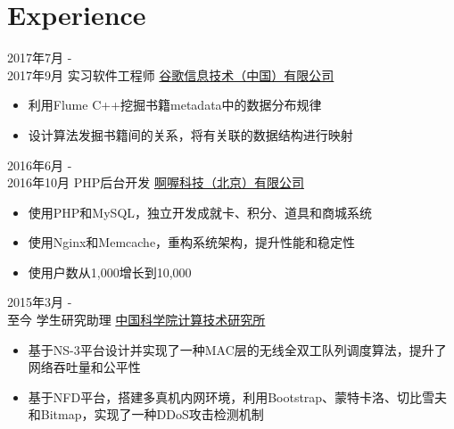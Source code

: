 \documentclass[a4paper]{twentysecondcv} %
\begin{document}
\makeprofile %



\section{Experience}

\begin{twenty} %
	\twentyitem
	{2017年7月 -  \\2017年9月}
	{实习软件工程师}
	{\href{http://www.rgoogle.com/}{谷歌信息技术（中国）有限公司}}
	{}
	{
		{\begin{itemize}
				\item 利用Flume C++挖掘书籍metadata中的数据分布规律
				\item 设计算法发掘书籍间的关系，将有关联的数据结构进行映射
		\end{itemize}}
	}
	
	\twentyitem
    	{2016年6月 - \\2016年10月}
        {PHP后台开发}
        {\href{http://www.runorout.cn/}{啊喔科技（北京）有限公司}}
        {}
        {
        {\begin{itemize}
        \item 使用PHP和MySQL，独立开发成就卡、积分、道具和商城系统
        \item 使用Nginx和Memcache，重构系统架构，提升性能和稳定性
        \item 使用户数从1,000增长到10,000
    \end{itemize}}
        }
    
    \twentyitem
	    {2015年3月 - \\至今}
	    {学生研究助理}
	    {\href{http://english.ict.cas.cn/}{中国科学院计算技术研究所}}
	    {}
	    {
    	{\begin{itemize}
    			\item 基于NS-3平台设计并实现了一种MAC层的无线全双工队列调度算法，提升了网络吞吐量和公平性
    			\item 基于NFD平台，搭建多真机内网环境，利用Bootstrap、蒙特卡洛、切比雪夫和Bitmap，实现了一种DDoS攻击检测机制
    	\end{itemize}}
    }
        
\end{twenty}
\end{document}
